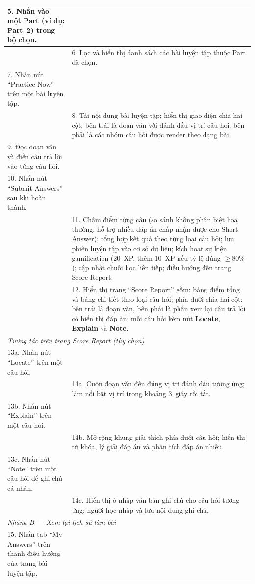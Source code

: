 \begin{longtable}{|p{\tbu}|p{\tbu}|}
    5. Nhấn vào một Part (ví dụ: Part~2) trong bộ chọn. & \\ \hline
    & 6. Lọc và hiển thị danh sách các bài luyện tập thuộc Part đã chọn. \\ \hline
    7. Nhấn nút ``Practice Now'' trên một bài luyện tập. & \\ \hline
    & 8. Tải nội dung bài luyện tập; hiển thị giao diện chia hai cột: bên trái là đoạn văn với đánh dấu vị trí câu hỏi, bên phải là các nhóm câu hỏi được render theo dạng bài. \\ \hline
    9. Đọc đoạn văn và điền câu trả lời vào từng câu hỏi. & \\ \hline
    10. Nhấn nút ``Submit Answers'' sau khi hoàn thành. & \\ \hline
    & 11. Chấm điểm từng câu (so sánh không phân biệt hoa thường, hỗ trợ nhiều đáp án chấp nhận được cho Short Answer); tổng hợp kết quả theo từng loại câu hỏi; lưu phiên luyện tập vào cơ sở dữ liệu; kích hoạt sự kiện gamification (20~XP, thêm 10~XP nếu tỷ lệ đúng $\geq 80\%$); cập nhật chuỗi học liên tiếp; điều hướng đến trang Score Report. \\ \hline
    & 12. Hiển thị trang ``Score Report'' gồm: bảng điểm tổng và bảng chi tiết theo loại câu hỏi; phía dưới chia hai cột: bên trái là đoạn văn, bên phải là phần xem lại câu trả lời có hiển thị đáp án; mỗi câu hỏi kèm nút \textbf{Locate}, \textbf{Explain} và \textbf{Note}. \\ \hline
    \multicolumn{2}{|l|}{\textit{Tương tác trên trang Score Report (tùy chọn)}} \\ \hline
    13a. Nhấn nút ``Locate'' trên một câu hỏi. & \\ \hline
    & 14a. Cuộn đoạn văn đến đúng vị trí đánh dấu tương ứng; làm nổi bật vị trí trong khoảng 3~giây rồi tắt. \\ \hline
    13b. Nhấn nút ``Explain'' trên một câu hỏi. & \\ \hline
    & 14b. Mở rộng khung giải thích phía dưới câu hỏi; hiển thị từ khóa, lý giải đáp án và phân tích đáp án nhiễu. \\ \hline
    13c. Nhấn nút ``Note'' trên một câu hỏi để ghi chú cá nhân. & \\ \hline
    & 14c. Hiển thị ô nhập văn bản ghi chú cho câu hỏi tương ứng; người học nhập và lưu nội dung ghi chú. \\ \hline
    \multicolumn{2}{|l|}{\textit{Nhánh B --- Xem lại lịch sử làm bài}} \\ \hline
    15. Nhấn tab ``My Answers'' trên thanh điều hướng của trang bài luyện tập. & \\ \hline

\end{longtable}
